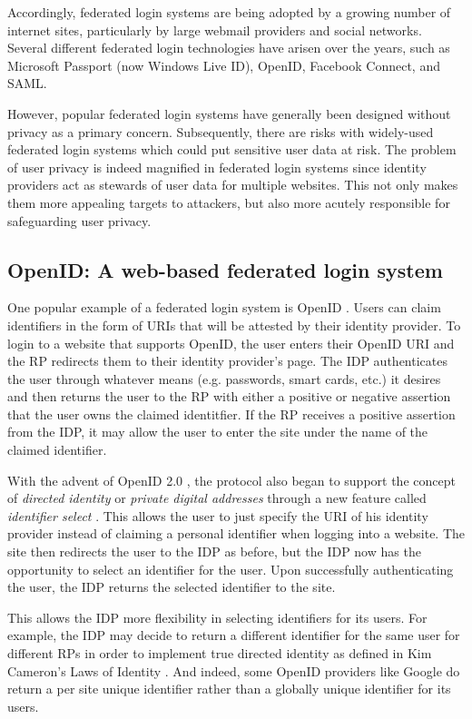 \documentclass{llncs}
\begin{document}
Accordingly, federated login systems are being adopted by a growing
number of internet sites, particularly by large webmail providers and
social networks.  Several different federated login technologies have
arisen over the years, such as Microsoft Passport (now Windows Live
ID), OpenID, Facebook Connect, and SAML.


However, popular federated login systems have generally been designed
without privacy as a primary concern. Subsequently, there are risks
with widely-used federated login systems which could put sensitive
user data at risk. The problem of user privacy is indeed magnified in
federated login systems since identity providers act as stewards of
user data for multiple websites. This not only makes them more
appealing targets to attackers, but also more acutely responsible for
safeguarding user privacy.


\subsection{OpenID: A web-based federated login system}

One popular example of a federated login system is OpenID
\cite{OID}. Users can claim identifiers in the form of URIs that will
be attested by their identity provider. To login to a website that
supports OpenID, the user enters their OpenID URI and the RP redirects
them to their identity provider's page. The IDP authenticates the user
through whatever means (e.g. passwords, smart cards, etc.) it desires
and then returns the user to the RP with either a positive or negative
assertion that the user owns the claimed identitfier. If the RP
receives a positive assertion from the IDP, it may allow the user to
enter the site under the name of the claimed identifier.

With the advent of OpenID 2.0 \cite{OID2}, the protocol also began to support
the concept of \emph{directed identity} \cite{Cam06} or \emph{private digital
addresses} through a new feature called \emph{identifier select} \cite{RR06}.
This allows the user to just specify the URI of his identity provider instead
of claiming a personal identifier when logging into a website. The site then
redirects the user to the IDP as before, but the IDP now has the opportunity to
select an identifier for the user. Upon successfully authenticating the user,
the IDP returns the selected identifier to the site.

This allows the IDP more flexibility in selecting identifiers for its users. For
example, the IDP may decide to return a different identifier for the same user
for different RPs in order to implement true directed identity as defined in Kim
Cameron's Laws of Identity \cite{Cam06}. And indeed, some OpenID providers like
Google do return a per site unique identifier rather than a globally unique
identifier for its users.
\end{document}
